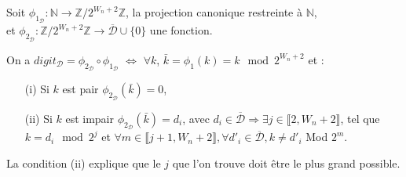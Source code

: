 \documentclass[12pt, a4paper]{memoir}
\begin{document}
\begin{Propriété}
 Soit $\phi_{1_\mathcal{D}} : \mathbb{N} \rightarrow \mathbb{Z} / 2^{W_n+2} \mathbb{Z}$, la projection canonique restreinte à $\mathbb{N}$, \\ 
 et $\phi_{2_\mathcal{D}} : \mathbb{Z} / 2^{W_n+2} \mathbb{Z} \rightarrow \overline{\mathcal{D}} \cup \{0\}$ une fonction.
 
 On a $digit_{\mathcal{D}} = \phi_{2_\mathcal{D}} \circ \phi_{1_\mathcal{D}}$ $\iff$
 $\forall k$, $\bar{k} = \phi_1(k) = k \mod 2^{W_n+2}$ et : \\
 \begin{itemize}
  \item [(i)] Si $k$ est pair $\phi_{2_\mathcal{D}}(\bar{k}) = 0$,
  \item [(ii)] Si $k$ est impair $\phi_{2_\mathcal{D}}(\bar{k}) = d_i$, avec $d_i \in \overline{\mathcal{D}} 
  \Rightarrow \exists j \in \llbracket 2,W_n+2 \rrbracket$,
 tel que $k = d_i \mod 2^j$ et $\forall m \in \llbracket j+1,W_n+2 \rrbracket, \forall d'_i \in \overline{\mathcal{D}}, k \neq d'_i$ Mod $2^m$.
 \end{itemize}
\end{Propriété}

\begin{Remarque}
 La condition (ii) explique que le $j$ que l'on trouve doit être le plus grand possible. 
\end{Remarque}
\end{document}
